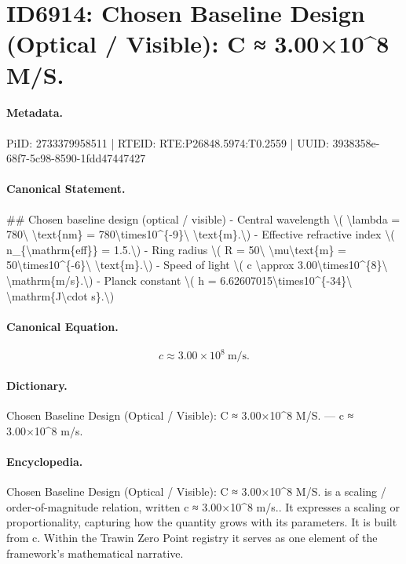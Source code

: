 \section*{ID6914: Chosen Baseline Design (Optical / Visible): C ≈ 3.00×10\textasciicircum{}8 M/S.}
\paragraph{Metadata.}
PiID: 2733379958511 | RTEID: RTE:P26848.5974:T0.2559 | UUID: 3938358e-68f7-5c98-8590-1fdd47447427

\paragraph{Canonical Statement.}
\#\# Chosen baseline design (optical / visible) - Central wavelength \textbackslash{}( \textbackslash{}lambda = 780\textbackslash{} \textbackslash{}text\{nm\} = 780\textbackslash{}times10\textasciicircum{}\{-9\}\textbackslash{} \textbackslash{}text\{m\}.\textbackslash{}) - Effective refractive index \textbackslash{}( n\_\{\textbackslash{}mathrm\{eff\}\} = 1.5.\textbackslash{}) - Ring radius \textbackslash{}( R = 50\textbackslash{} \textbackslash{}mu\textbackslash{}text\{m\} = 50\textbackslash{}times10\textasciicircum{}\{-6\}\textbackslash{} \textbackslash{}text\{m\}.\textbackslash{}) - Speed of light \textbackslash{}( c \textbackslash{}approx 3.00\textbackslash{}times10\textasciicircum{}\{8\}\textbackslash{} \textbackslash{}mathrm\{m/s\}.\textbackslash{}) - Planck constant \textbackslash{}( h = 6.62607015\textbackslash{}times10\textasciicircum{}\{-34\}\textbackslash{} \textbackslash{}mathrm\{J\textbackslash{}cdot s\}.\textbackslash{})

\paragraph{Canonical Equation.}
\[
c \approx 3.00\times10^{8}\ \mathrm{m/s}.
\]

\paragraph{Dictionary.}
Chosen Baseline Design (Optical / Visible): C ≈ 3.00×10\textasciicircum{}8 M/S. — c ≈ 3.00×10\textasciicircum{}8 m/s.

\paragraph{Encyclopedia.}
Chosen Baseline Design (Optical / Visible): C ≈ 3.00×10\textasciicircum{}8 M/S. is a scaling / order-of-magnitude relation, written c ≈ 3.00×10\textasciicircum{}8 m/s.. It expresses a scaling or proportionality, capturing how the quantity grows with its parameters. It is built from c. Within the Trawin Zero Point registry it serves as one element of the framework's mathematical narrative.
